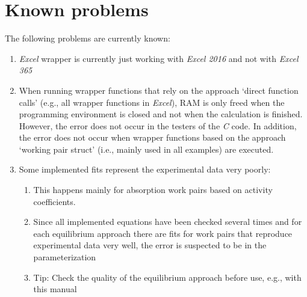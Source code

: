 \section{Known problems}
\label{cha:usage:problems}
%
The following problems are currently known:
\begin{enumerate}
	\item \textit{Excel} wrapper is currently just working with \textit{Excel 2016} and not with \textit{Excel 365}
	\item When running wrapper functions that rely on the approach ‘direct function calls’ (e.g., all wrapper functions in \textit{Excel}), RAM is only freed when the programming environment is closed and not when the calculation is finished. However, the error does not occur in the testers of the \textit{C} code. In addition, the error does not occur when wrapper functions based on the approach ‘working pair struct’ (i.e., mainly used in all examples) are executed.
	\item Some implemented fits represent the experimental data very poorly:
	\begin{enumerate}
		\item This happens mainly for absorption work pairs based on activity coefficients.
		\item Since all implemented equations have been checked several times and for each equilibrium approach there are fits for work pairs that reproduce experimental data very well, the error is suspected to be in the parameterization
		\item Tip: Check the quality of the equilibrium approach before use, e.g., with this manual
	\end{enumerate}
\end{enumerate}

